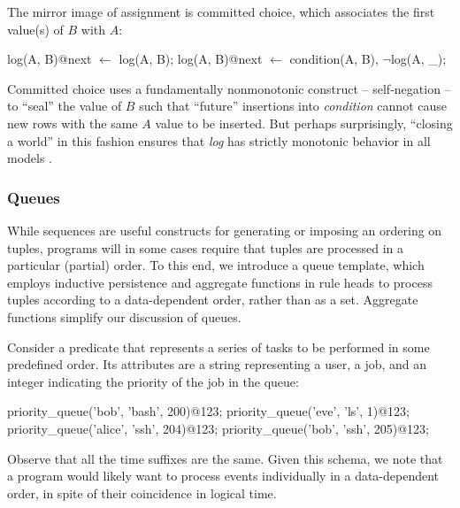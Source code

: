 The mirror image of assignment is committed choice, which associates the first value(s)
of $B$ with $A$:

\begin{Dedalus}
log(A, B)@next \(\leftarrow\) log(A, B);
log(A, B)@next \(\leftarrow\) condition(A, B), \(\lnot\)log(A, _);
\end{Dedalus}

Committed choice uses a fundamentally nonmonotonic  construct -- self-negation --
to ``seal'' the value of $B$ such that ``future'' insertions into {\em condition} cannot
cause new rows with the same $A$ value to be inserted.  But perhaps surprisingly,
``closing a world'' in this fashion ensures that {\em log} has strictly monotonic 
behavior in all models .

\subsubsection{Queues}

While sequences are useful constructs for generating or imposing an ordering on tuples, programs will in some cases require that tuples
are processed in a particular (partial) order.  To this end, we introduce a queue template, which employs 
inductive persistence and aggregate functions in rule heads to process tuples according to a data-dependent order, rather than as a set.  Aggregate functions simplify our discussion of queues.  

Consider a predicate  that represents a series of tasks to be performed in some predefined order.  Its attributes are a string representing a user, a job, and an integer
indicating the priority of the job in the queue:

\begin{Dedalus}
priority\_queue('bob', 'bash', 200)@123;
priority\_queue('eve', 'ls', 1)@123;
priority\_queue('alice', 'ssh', 204)@123;
priority\_queue('bob', 'ssh', 205)@123;
\end{Dedalus}

Observe that all the time suffixes are the same.  
Given this schema, we note that a program would likely want to process
 events individually in a data-dependent order, in
spite of their coincidence in logical time.  

